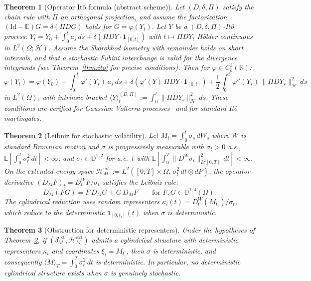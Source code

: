 \documentclass[11pt,a4paper]{article}
\theoremstyle{plain}
\newtheorem{mainthm}{Theorem}
\theoremstyle{definition}
\theoremstyle{remark}
\newcommand{\E}{\mathbb{E}}
\newcommand{\R}{\mathbb{R}}
\newcommand{\Id}{\mathrm{Id}}
\newcommand{\HM}{\mathcal{H}_M}
\begin{document}
\begin{mainthm}[Operator It\^o formula (abstract scheme)]\label{thmC}
Let $(D,\delta,\Pi)$ satisfy the chain rule with $\Pi$ an orthogonal projection, and assume the factorization $(\Id-\E)G = \delta(\Pi DG)$ holds for $G = \varphi(Y_t)$. Let $Y$ be a $(D,\delta,\Pi)$-It\^o process: $Y_t = Y_0 + \int_0^t a_s\,ds + \delta(\Pi DY \cdot \mathbf{1}_{[0,t]})$ with $t \mapsto \Pi DY_t$ H\"older continuous in $L^2(\Omega;\mathcal{H})$. Assume the Skorokhod isometry with remainder holds on short intervals, and that a stochastic Fubini interchange is valid for the divergence integrands (see Theorem~\ref{thm:ito} for precise conditions). Then for $\varphi \in C_b^3(\R)$:
\[
\varphi(Y_t) = \varphi(Y_0) + \int_0^t\varphi'(Y_s)\,a_s\,ds + \delta(\varphi'(Y)\,\Pi DY\cdot\mathbf{1}_{[0,t]}) + \frac{1}{2}\int_0^t\varphi''(Y_s)\,\|\Pi DY_s\|^2_{\mathcal{H}}\,ds
\]
in $L^2(\Omega)$, with intrinsic bracket $\langle Y\rangle_t^{(D,\Pi)} := \int_0^t\|\Pi DY_s\|^2_{\mathcal{H}}\,ds$. These conditions are verified for Gaussian Volterra processes~\cite{Decreusefond1999} and for standard It\^o martingales.
\end{mainthm}

\begin{mainthm}[Leibniz for stochastic volatility]\label{thmD}
Let $M_t = \int_0^t\sigma_s\,dW_s$ where $W$ is standard Brownian motion and $\sigma$ is progressively measurable with $\sigma_t > 0$ a.s., $\E[\int_0^T\sigma_t^2\,dt] < \infty$, and $\sigma_t \in \mathbb{D}^{1,2}$ for a.e.~$t$ with $\E[\int_0^T\|D^W\sigma_t\|^2_{L^2[0,T]}\,dt] < \infty$. On the extended energy space $\HM^{\mathrm{ext}} := L^2([0,T]\times\Omega,\,\sigma_t^2\,dt\otimes dP)$, the operator derivative $(D_MF)_t = D_t^WF/\sigma_t$ satisfies the Leibniz rule:
\[
D_M(FG) = F\,D_MG + G\,D_MF \qquad\text{for } F,G \in \mathbb{D}^{1,4}(\Omega).
\]
The cylindrical reduction uses random representers $\kappa_i(t) = D_t^W(M_{t_i})/\sigma_t$, which reduce to the deterministic $\mathbf{1}_{[0,t_i]}(t)$ when $\sigma$ is deterministic.
\end{mainthm}

\begin{mainthm}[Obstruction for deterministic representers]\label{thmE}
Under the hypotheses of Theorem~\ref{thmD}, if $(\delta_M^{\mathrm{ext}},\HM^{\mathrm{ext}})$ admits a cylindrical structure with deterministic representers $\kappa_i$ and coordinates $\xi_i = M_{t_i}$, then $\sigma$ is deterministic, and consequently $\langle M\rangle_T = \int_0^T\sigma_t^2\,dt$ is deterministic. In particular, no deterministic cylindrical structure exists when $\sigma$ is genuinely stochastic.
\end{mainthm}
\end{document}
